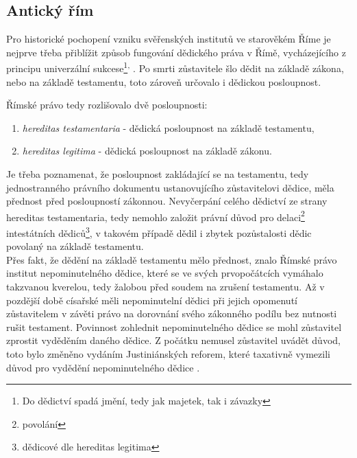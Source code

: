 \documentclass{article}
\begin{document}
\newpage

\subsection{Antický řím}

Pro historické pochopení vzniku svěřenských institutů ve starověkém Říme je nejprve třeba přiblížit způsob fungování dědického práva v Římě, vycházejícího z principu univerzální sukcese\footnote{Do dědictví spadá jmění, tedy jak majetek, tak i závazky}\textsuperscript{,} . Po smrti zůstavitele šlo dědit na základě zákona, nebo na základě testamentu, toto zároveň určovalo i dědickou posloupnost. \\

\vspace{5 mm}

Římské právo tedy rozlišovalo dvě posloupnosti:
\begin{enumerate}
\item \textit{hereditas testamentaria} - dědická posloupnost na základě testamentu,
\item \textit{hereditas legitima} - dědická posloupnost na základě zákonu.
\end{enumerate}

\vspace{5 mm}

Je třeba poznamenat, že posloupnost zakládající se na testamentu, tedy jednostranného právního dokumentu ustanovujícího zůstavitelovi dědice, měla přednost před posloupností zákonnou. Nevyčerpání celého dědictví ze strany hereditas testamentaria, tedy nemohlo založit právní důvod pro delaci\footnote{povolání} intestátních dědiců\footnote{dědicové dle hereditas legitima}, v takovém případě dědil i zbytek pozůstalosti dědic povolaný na základě testamentu. \\

Přes fakt, že dědění na základě testamentu mělo přednost, znalo Římské právo institut nepominutelného dědice, které se ve svých prvopočátcích vymáhalo takzvanou kverelou, tedy žalobou před soudem na zrušení testamentu. Až v pozdější době císařské měli nepominutelní dědici při jejich opomenutí zůstavitelem v závěti právo na dorovnání svého zákonného podílu bez nutnosti rušit testament. Povinnost zohlednit nepominutelného dědice se mohl zůstavitel zprostit vyděděním daného dědice. Z počátku nemusel zůstavitel uvádět důvod, toto bylo změněno vydáním Justiniánských reforem, které taxativně vymezili důvod pro vydědění nepominutelného dědice  . \\
\end{document}
